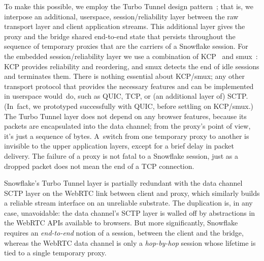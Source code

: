 \documentclass[letterpaper,twocolumn]{article}
\begin{document}
To make this possible, we employ the
Turbo Tunnel design pattern~\cite{Fifield2020a};
that is, we interpose an additional, userspace,
session/reliability layer between the raw transport layer
and client application streams.
This additional layer gives the proxy and the bridge
shared end-to-end state that persists throughout
the sequence of temporary proxies that are the carriers of a Snowflake session.
For the embedded session/reliability layer
we use a combination of
KCP~\cite{kcp} and
smux~\cite{smux}:
KCP provides reliability and reordering,
and smux detects the end of idle sessions and terminates them.
There is nothing essential about KCP/smux;
any other transport protocol that provides the necessary features
and can be implemented in userspace would~do,
such as QUIC, TCP, or (an additional layer of) SCTP.
(In~fact, we prototyped successfully with QUIC, before settling on KCP/smux.)
The Turbo Tunnel layer does not depend on any browser features,
because its packets are encapsulated into the data channel;
from the proxy's point of view, it's just a sequence of bytes.
A~switch from one temporary proxy to another
is invisible to the upper application layers,
except for a brief delay in packet delivery.
The failure of a proxy
is not fatal to a Snowflake session,
just as a dropped packet does not mean the end of a TCP connection.

Snowflake's Turbo Tunnel layer
is partially redundant with the data channel SCTP layer
on the WebRTC link between client and proxy,
which similarly builds a reliable stream interface
on an unreliable substrate.
The duplication is, in any case, unavoidable:
the data channel's SCTP layer is walled off by abstractions
in the WebRTC APIs available to browsers.
But more significantly, Snowflake requires an
\emph{end-to-end} notion of a session,
between the client and the bridge,
whereas the WebRTC data channel is only a
\emph{hop-by-hop} session
whose lifetime is tied to a single temporary proxy.
\end{document}
